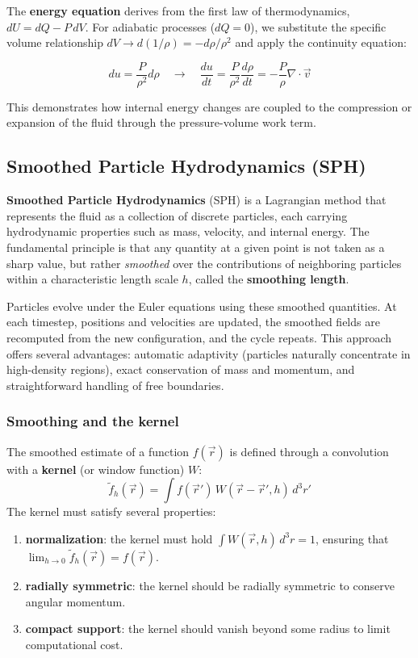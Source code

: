 The \textbf{energy equation} derives from the first law of thermodynamics, $dU = dQ - P\,dV$. For adiabatic processes ($dQ = 0$), we substitute the specific volume relationship $dV \rightarrow d(1/\rho) = -d\rho/\rho^2$ and apply the continuity equation:

$$
du = \dfrac{P}{\rho^2} d\rho \quad\longrightarrow\quad \dfrac{du}{dt} = \dfrac{P}{\rho^2} \dfrac{d\rho}{dt} = - \dfrac{P}{\rho} \nabla \cdot \vec{v}
$$

This demonstrates how internal energy changes are coupled to the compression or expansion of the fluid through the pressure-volume work term.

\subsection{Smoothed Particle Hydrodynamics (SPH)}

\textbf{Smoothed Particle Hydrodynamics} (SPH) is a Lagrangian method that represents the fluid as a collection of discrete particles, each carrying hydrodynamic properties such as mass, velocity, and internal energy. The fundamental principle is that any quantity at a given point is not taken as a sharp value, but rather \emph{smoothed} over the contributions of neighboring particles within a characteristic length scale $h$, called the \textbf{smoothing length}.

Particles evolve under the Euler equations using these smoothed quantities. At each timestep, positions and velocities are updated, the smoothed fields are recomputed from the new configuration, and the cycle repeats. This approach offers several advantages: automatic adaptivity (particles naturally concentrate in high-density regions), exact conservation of mass and momentum, and straightforward handling of free boundaries.

\subsubsection{Smoothing and the kernel}

The smoothed estimate of a function $f(\vec{r})$ is defined through a convolution with a \textbf{kernel} (or window function) $W$:
$$
\tilde{f}_h(\vec{r}) = \int f(\vec{r}') \, W(\vec{r} - \vec{r}', h) \, d^3r'
$$
The kernel must satisfy several properties:
\begin{enumerate}
    \item \textbf{normalization}: the kernel must hold $\int W(\vec{r}, h) \, d^3r = 1$, ensuring that $\lim_{h \to 0} \tilde{f}_h(\vec{r}) = f(\vec{r})$. 
    \item \textbf{radially symmetric}: the kernel should be radially symmetric to conserve angular momentum. 
    \item \textbf{compact support}: the kernel should vanish beyond some radius to limit computational cost.
\end{enumerate}

